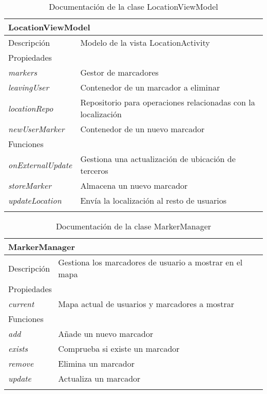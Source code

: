 \begin{longtable}{|p{} p{}|}
    \hline
    \multicolumn{2}{|l|}{\textbf{LocationViewModel}} \\ \hline \hline
    Descripción      & Modelo de la vista LocationActivity \\ \hline
    \multicolumn{2}{|l|}{Propiedades} \\
    \emph{markers}  & Gestor de marcadores  \\
    \emph{leavingUser}  & Contenedor de un marcador a eliminar  \\
    \emph{locationRepo}  & Repositorio para operaciones relacionadas con la localización  \\
    \emph{newUserMarker}  & Contenedor de un nuevo marcador  \\\hline
    \multicolumn{2}{|l|}{Funciones} \\
    \emph{onExternalUpdate}  & Gestiona una actualización de ubicación de terceros \\ 
    \emph{storeMarker}  & Almacena un nuevo marcador \\
    \emph{updateLocation}  & Envía la localización al resto de usuarios \\\hline
    \caption{Documentación de la clase LocationViewModel}
    \label{dis:app:location_viewmodel}
\end{longtable}

\newpage
\begin{longtable}{|p{} p{}|}
    \hline
    \multicolumn{2}{|l|}{\textbf{MarkerManager}} \\ \hline \hline
    Descripción      & Gestiona los marcadores de usuario a mostrar en el mapa \\ \hline
    \multicolumn{2}{|l|}{Propiedades} \\
    \emph{current}  & Mapa actual de usuarios y marcadores a mostrar  \\\hline
    \multicolumn{2}{|l|}{Funciones} \\
    \emph{add}  & Añade un nuevo marcador \\ 
    \emph{exists}  & Comprueba si existe un marcador \\
    \emph{remove}  & Elimina un marcador \\
    \emph{update}  & Actualiza un marcador \\ \hline
    \caption{Documentación de la clase MarkerManager}
    \label{dis:app:marker_manager}
\end{longtable}

